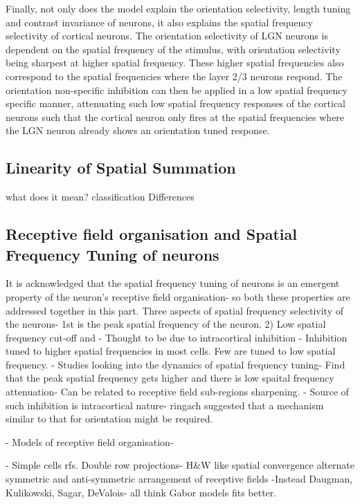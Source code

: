 Finally, not only does the model explain the orientation selectivity, length tuning and contrast invariance of neurons, it also explains the spatial frequency selectivity of cortical neurons. The orientation selectivity of LGN neurons is dependent on the spatial frequency of the stimulus, with orientation selectivity being sharpest at higher spatial frequency. These higher spatial frequencies also correspond to the spatial frequencies where the layer 2/3 neurons respond. The orientation non-specific inhibition can then be applied in a low spatial frequency specific manner, attenuating such low spatial frequency responses of the cortical neurons such that the cortical neuron only fires at the spatial frequencies where the LGN neuron already shows an orientation tuned response.




\subsection{Linearity of Spatial Summation}

what does it mean?
classification
Differences

\subsection{Receptive field organisation and Spatial Frequency Tuning of neurons}

It is acknowledged that the spatial frequency tuning of neurons is an emergent property of the neuron's receptive field organisation- so both these properties are addressed together in this part.
Three aspects of spatial frequency selectivity of the neurons- 1st is the peak spatial frequency of the neuron.
 2) Low spatial frequency cut-off and 
  - Thought to be due to intracortical inhibition
  - Inhibition tuned to higher spatial frequencies in most cells. Few are tuned to low spatial frequency. 
  - Studies looking into the dynamics of spatial frequency tuning- Find that the peak spatial frequency gets higher and there is low spaital frequency attenuation- Can be related to receptive field sub-regions sharpening. 
  - Source of such inhibition is intracortical nature- ringach suggested that a mechanism similar to that for orientation might be required.
  
  - Models of receptive field organisation- 
  
 - Simple cells rfs. Double row projections- H\&W like spatial convergence alternate symmetric and anti-symmetric arrangement of receptive fields
 -Instead Daugman, Kulikowski, Sagar, DeValois- all think Gabor models fits better. 
 
